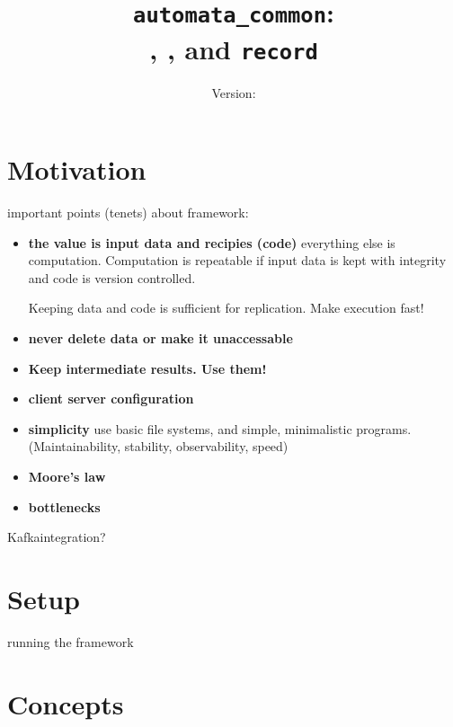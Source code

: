 \documentclass[a4paper]{report}
\title{\texttt{automata\_common}:\\ \jobtuple, \joblist, and \texttt{record}}
\author{Version: \inputfile{gitrevision}}
\date{}
\begin{document}




%

\chapter{Motivation}
important points (tenets) about framework:
\begin{itemize}
\item \textbf{the value is input data and recipies (code)} everything
  else is computation.  Computation is repeatable if input data is
  kept with integrity and code is version controlled.

  Keeping data and code is
  sufficient for replication.  Make execution fast!


\item \textbf{never delete data or make it unaccessable}

\item \textbf{Keep intermediate results.  Use them!}

\item \textbf{client server configuration}
\item \textbf{simplicity} use basic file systems, and simple,
  minimalistic programs.  (Maintainability, stability, observability,
  speed)
\item \textbf{Moore's law}
\item \textbf{bottlenecks}
\end{itemize}




Kafkaintegration?

\chapter{Setup}


running the framework

\chapter{Concepts}

\end{document}
